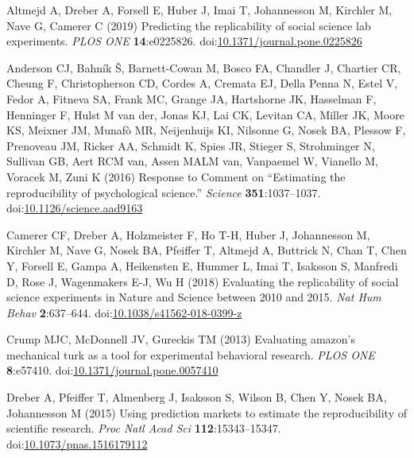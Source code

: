 \documentclass[
  english,
  a4paper,
]{article}
\newlength{\cslhangindent}
\newlength{\cslentryspacingunit} %
\newenvironment{CSLReferences}[2] %
 {%
  \setlength{\parindent}{0pt}
  \ifodd #1
  \let\oldpar\par
  \def\par{\hangindent=\cslhangindent\oldpar}
  \fi
  \setlength{\parskip}{#2\cslentryspacingunit}
 }%
 {}
\begin{document}
\hypertarget{refs}{}
\begin{CSLReferences}{1}{0}
\leavevmode{}%
Altmejd A, Dreber A, Forsell E, Huber J, Imai T, Johannesson M, Kirchler M, Nave G, Camerer C (2019) Predicting the replicability of social science lab experiments. \emph{PLOS ONE} \textbf{14}:e0225826. doi:\href{https://doi.org/10.1371/journal.pone.0225826}{10.1371/journal.pone.0225826}

\leavevmode{}%
Anderson CJ, Bahník Š, Barnett-Cowan M, Bosco FA, Chandler J, Chartier CR, Cheung F, Christopherson CD, Cordes A, Cremata EJ, Della Penna N, Estel V, Fedor A, Fitneva SA, Frank MC, Grange JA, Hartshorne JK, Hasselman F, Henninger F, Hulst M van der, Jonas KJ, Lai CK, Levitan CA, Miller JK, Moore KS, Meixner JM, Munafò MR, Neijenhuijs KI, Nilsonne G, Nosek BA, Plessow F, Prenoveau JM, Ricker AA, Schmidt K, Spies JR, Stieger S, Strohminger N, Sullivan GB, Aert RCM van, Assen MALM van, Vanpaemel W, Vianello M, Voracek M, Zuni K (2016) Response to {Comment} on {``{Estimating} the reproducibility of psychological science.''} \emph{Science} \textbf{351}:1037--1037. doi:\href{https://doi.org/10.1126/science.aad9163}{10.1126/science.aad9163}

\leavevmode{}%
Camerer CF, Dreber A, Holzmeister F, Ho T-H, Huber J, Johannesson M, Kirchler M, Nave G, Nosek BA, Pfeiffer T, Altmejd A, Buttrick N, Chan T, Chen Y, Forsell E, Gampa A, Heikensten E, Hummer L, Imai T, Isaksson S, Manfredi D, Rose J, Wagenmakers E-J, Wu H (2018) Evaluating the replicability of social science experiments in {Nature} and {Science} between 2010 and 2015. \emph{Nat Hum Behav} \textbf{2}:637--644. doi:\href{https://doi.org/10.1038/s41562-018-0399-z}{10.1038/s41562-018-0399-z}

\leavevmode{}%
Crump MJC, McDonnell JV, Gureckis TM (2013) Evaluating amazon's mechanical turk as a tool for experimental behavioral research. \emph{{PLOS} {ONE}} \textbf{8}:e57410. doi:\href{https://doi.org/10.1371/journal.pone.0057410}{10.1371/journal.pone.0057410}

\leavevmode{}%
Dreber A, Pfeiffer T, Almenberg J, Isaksson S, Wilson B, Chen Y, Nosek BA, Johannesson M (2015) Using prediction markets to estimate the reproducibility of scientific research. \emph{Proc Natl Acad Sci} \textbf{112}:15343--15347. doi:\href{https://doi.org/10.1073/pnas.1516179112}{10.1073/pnas.1516179112}


\end{CSLReferences}
\end{document}
